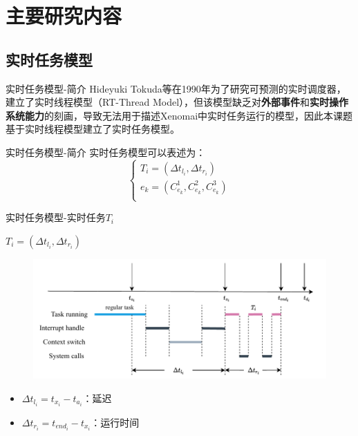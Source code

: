 \documentclass{beamer}
\begin{document}
\section{主要研究内容}

\subsection{实时任务模型}

\begin{frame}{实时任务模型-简介}
    Hideyuki Tokuda等在1990年为了研究可预测的实时调度器，建立了实时线程模型（RT-Thread Model），但该模型缺乏对\textbf{外部事件}和\textbf{实时操作系统能力}的刻画，导致无法用于描述Xenomai中实时任务运行的模型，因此本课题基于实时线程模型建立了实时任务模型。
\end{frame}

\begin{frame}{实时任务模型-简介}
    实时任务模型可以表述为：
    \begin{equation}
        \begin{cases}
            T_i=(\Delta t_{l_i}, \Delta t_{r_i}) \\
            e_k=(C_{e_{k}}^1,C_{e_{k}}^2,C_{e_{k}}^3) \\
        \end{cases}
    \end{equation}
\end{frame}

\begin{frame}{实时任务模型-实时任务$T_i$}
    \begin{center}
        $T_i=(\Delta t_{l_i}, \Delta t_{r_i})$
    \end{center}
    \begin{figure}[h]
        \centering
        \includegraphics[height=.45\textheight]{img/Img/time-line.pdf}
    \end{figure}
    \begin{itemize}
        \item $\Delta t_{l_i} = t_{x_i}-t_{a_i}$：延迟
        \item $\Delta t_{r_i} = t_{end_i} - t_{x_i}$：运行时间
    \end{itemize}
\end{frame}
\end{document}
